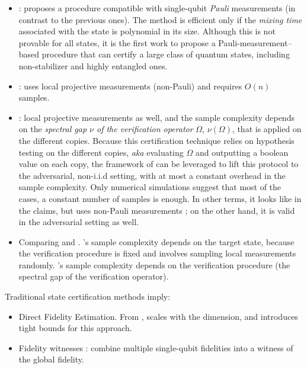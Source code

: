 \documentclass[11pt]{article}
\begin{document}
\begin{itemize}
    \item \cite{HPS24certifying}: proposes a procedure compatible with single-qubit \emph{Pauli} measurements (in contrast to the previous ones). The method is efficient only if the \emph{mixing time} associated with the state is polynomial in its size. Although this is not provable for all states, it is the first work to propose a Pauli-measurement--based procedure that can certify a large class of quantum states, including non-stabilizer and highly entangled ones.
    \item \cite{GHO25few}: uses local projective measurements (non-Pauli) and requires $O(n)$ samples.
    \item \cite{LZ25universal}: local projective measurements as well, and the sample complexity depends on the \emph{spectral gap $\nu$ of the verification operator} $\Omega$, $\nu(\Omega)$, that is applied on the different copies. Because this certification technique relies on hypothesis testing on the different copies, \emph{aka} evaluating $\Omega$ and outputting a boolean value on each copy, the framework of \cite{ZH19efficient} can  be leveraged to lift this protocol to the adversarial, non-i.i.d setting, with at most a constant overhead in the sample complexity.
    Only numerical simulations suggest that most of the cases, a constant number of samples is enough.
    In other terms, it looks like \cite{HPS24certifying} in the claims, but uses non-Pauli measurements ; on the other hand, it is valid in the adversarial setting as well.
    \item Comparing \cite{HPS24certifying} and \cite{LZ25universal}. \cite{HPS24certifying}'s sample complexity depends on the target state, because the verification procedure is fixed and involves sampling local measurements randomly. \cite{LZ25universal}'s sample complexity depends on the verification procedure (the spectral gap of the verification operator).
\end{itemize}
Traditional state certification methods imply:
\begin{itemize}
    \item Direct Fidelity Estimation. From \cite{FL11direct}, scales with the dimension, and \cite{FOS24optimal} introduces tight bounds for this approach.
    \item Fidelity witnesses \cite{CGKM21efficient}: combine multiple single-qubit fidelities into a witness of the global fidelity.
\end{itemize}
\end{document}
